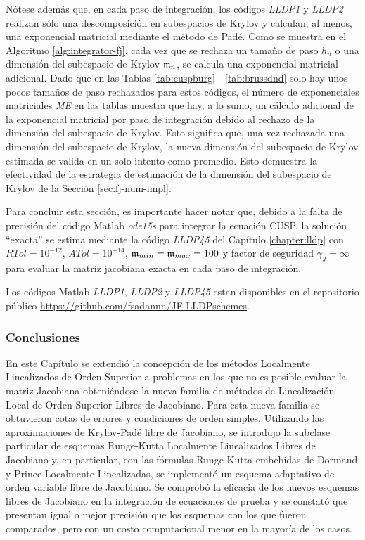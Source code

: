 Nótese además que, en cada paso de integración, los códigos \emph{LLDP1} y \emph{LLDP2} realizan sólo una descomposición en subespacios de Krylov y calculan, al menos, una exponencial matricial mediante el método de Padé. Como se muestra en el Algoritmo \ref{alg:integrator-fj}, cada vez que se rechaza un tamaño de paso $ h_n $ o una dimensión del subespacio de Krylov $ \mathfrak{m}_n $, se calcula una exponencial matricial adicional. Dado que en las Tablas \ref{tab:cuspburg} - \ref{tab:brussdnd} solo hay unos pocos tamaños de paso rechazados para estos códigos, el número de exponenciales matriciales  \textit{ME} en las tablas muestra que hay, a lo sumo, un cálculo adicional de la exponencial matricial por paso de integración debido al rechazo de la dimensión del subespacio de Krylov. Esto significa que, una vez rechazada una dimensión del subespacio de Krylov, la nueva dimensión del subespacio de Krylov estimada se valida en un solo intento como promedio. Esto demuestra la efectividad de la estrategia de estimación de la dimensión del subespacio de Krylov de la Sección \ref{sec:fj-num-impl}.

Para concluir esta sección, es importante hacer notar que, debido a la falta de precisión del código Matlab \emph{ode15s} para integrar la ecuación CUSP, la solución ``exacta'' se estima mediante la código \emph{LLDP45} del Capítulo \ref{chapter:lldp} con $ RTol = 10^{-12} $, $ATol = 10^{-14}$, $\mathfrak{m}_{min } = \mathfrak{m}_{max} = 100$ y factor de seguridad $\gamma_J=\infty$ para evaluar la matriz jacobiana exacta en cada paso de integración.

Los códigos Matlab \emph{LLDP1}, \emph{LLDP2} y \emph{LLDP45} estan disponibles en el repositorio público \url{https://github.com/fsadannn/JF-LLDPschemes}.


\vspace{5cm}
\subsubsection{Conclusiones}
En este Capítulo se extendió la concepción de los métodos Localmente Linealizados de Orden Superior a problemas en los que no es posible evaluar la matriz Jacobiana obteniéndose la nueva familia de métodos de Linealización Local de Orden Superior Libres de Jacobiano. Para esta nueva familia se obtuvieron cotas de errores y condiciones de orden simples. Utilizando las aproximaciones de Krylov-Padé libre de Jacobiano, se introdujo la subclase particular de esquemas Runge-Kutta Localmente Linealizados
Libres de Jacobiano y, en particular, con las fórmulas Runge-Kutta embebidas de Dormand y Prince Localmente Linealizadas, se implementó un esquema adaptativo de orden variable libre de Jacobiano. Se comprobó la eficacia de los nuevos esquemas libres de Jacobiano en la integración de
ecuaciones de prueba y se constató que presentan igual o mejor precisión que los esquemas con los que fueron comparados, pero con un costo computacional menor en la mayoría de los casos.

